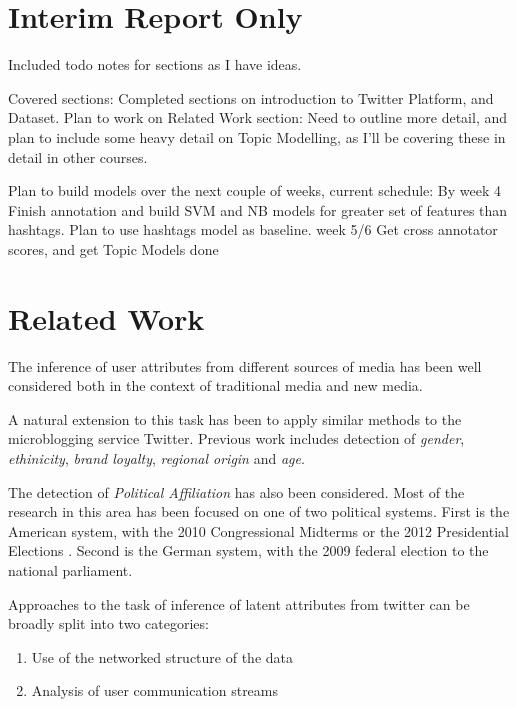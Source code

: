 \documentclass[bsc,frontabs,singlespacing,parskip]{infthesis}     %
\begin{document}
\chapter{Interim Report Only}
Included todo notes for sections as I have ideas.

Covered sections:
Completed sections on introduction to Twitter Platform, and Dataset. 
Plan to work on Related Work section: Need to outline more detail, and plan to include some heavy detail on Topic Modelling, as I'll be covering these in detail in other courses. 

Plan to build models over the next couple of weeks, current schedule:
By week 4 Finish annotation and build SVM and NB models for greater set of features than hashtags. Plan to use hashtags model as baseline. 
week 5/6 Get cross annotator scores, and get Topic Models done




\chapter{Related Work}

The inference of user attributes from different sources of media has been well considered both in the context of traditional media and new media. 



A natural extension to this task has been to apply similar methods to the microblogging service Twitter. Previous work includes detection of \textit{gender}, \textit{ethinicity}, \textit{brand loyalty}, \textit{regional origin} and \textit{age}.\cite{yahoopaper}\cite{rao2010}

The detection of \textit{Political Affiliation} has also been considered. Most of the research in this area has been focused on one of two political systems. First is the American system, with the 2010 Congressional Midterms\cite{Conover2010predicting}  \cite{politicalpolar}\cite{yahoopaper} or the 2012 Presidential Elections \cite{quantpol}. Second is the German system, with the 2009 federal election to the national parliament\cite{predelections}\cite{dividedtheytweet}. 

Approaches to the task of inference of latent attributes from twitter can be broadly split into two categories:
\begin{enumerate}
\item{Use of the networked structure of the data}
\item{Analysis of user communication streams}
\end{enumerate}
\end{document}
